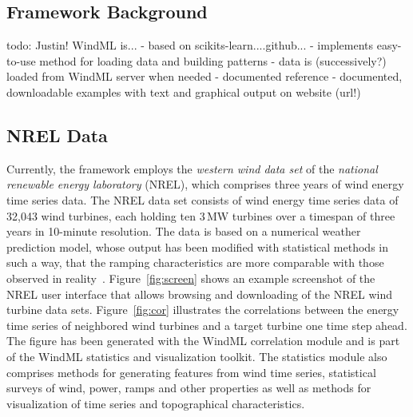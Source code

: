 \documentclass[10pt, conference, compsocconf]{IEEEtran}
\begin{document}
\subsection{Framework Background}

todo: Justin!
WindML is...
- based on scikits-learn....github...
- implements easy-to-use method for loading data and building patterns
- data is (successively?) loaded from WindML server when needed
- documented reference
- documented, downloadable examples with text and graphical output on website (url!)


\subsection{NREL Data}

Currently, the framework employs the \textit{western wind data set} of the \textit{national renewable energy laboratory} (NREL), which comprises three years of wind energy time series data. The NREL data set consists of wind energy time series data of 32,043 wind turbines, each holding ten 3\,MW turbines over a timespan of three years in 10-minute resolution. The data is based on a numerical weather prediction model, whose output has been modified with statistical methods in such a way, that the ramping characteristics are more comparable with those observed in reality~\cite{Potter}. Figure~\ref{fig:screen} shows an example screenshot of the NREL user interface that allows browsing and downloading of the NREL wind turbine data sets. Figure~\ref{fig:cor} illustrates the correlations between the energy time series of neighbored wind turbines and a target turbine one time step ahead. The figure has been generated with the WindML correlation module and is part of the WindML statistics and visualization toolkit. The statistics module also comprises methods for generating features from wind time series, statistical surveys of wind, power, ramps and other properties as well as methods for visualization of time series and topographical characteristics.
\end{document}
